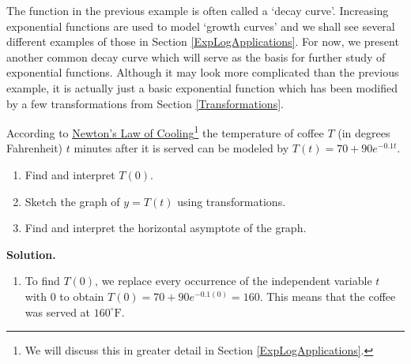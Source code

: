 The function in the previous example is often called a `decay curve'.  Increasing exponential functions are used to model `growth curves' and we shall see several different examples of those in Section \ref{ExpLogApplications}.  For now, we present another common decay curve which will serve as the basis for further study of exponential functions.  Although it may look more complicated than the previous example, it is actually just a basic exponential function which has been modified by a few transformations from Section \ref{Transformations}.

\begin{ex}  \label{exptempex} According to \href{http://en.wikipedia.org/wiki/Heat_transfer#Newton.27s_law_of_cooling}{\underline{Newton's Law of Cooling}}\footnote{We will discuss this in greater detail in Section \ref{ExpLogApplications}.} the temperature of coffee $T$ (in degrees Fahrenheit) $t$ minutes after it is served can be modeled by $T(t) = 70 + 90 e^{-0.1 t}$. 

\begin{enumerate}

\item  Find and interpret $T(0)$.

\item  Sketch the graph of $y = T(t)$ using transformations.

\item  Find and interpret the horizontal asymptote of the graph.

\end{enumerate}

{\bf Solution.}

\begin{enumerate}

\item  To find $T(0)$, we replace every occurrence of the independent variable $t$ with $0$ to obtain  $T(0) =70 + 90 e^{-0.1 (0)} = 160$.  This means that the coffee was served at $160^{\circ}\mbox{F}$.


\end{enumerate}
\end{ex}
